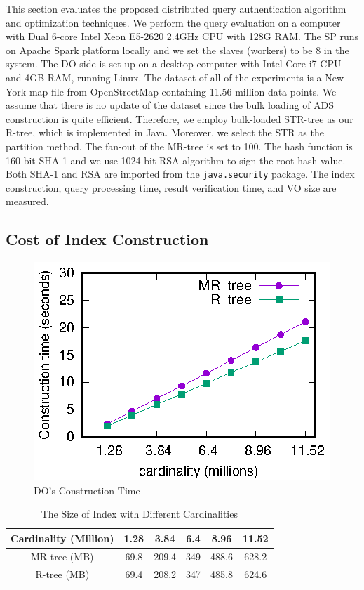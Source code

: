 This section evaluates the proposed distributed query authentication algorithm and optimization techniques. We perform the query evaluation on a computer with Dual 6-core Intel Xeon E5-2620 2.4GHz CPU with 128G RAM\@. %
The SP runs on Apache Spark platform locally and we set the slaves (workers) to be $8$ in the system. The DO side is set up on a desktop computer with Intel Core i7 CPU and 4GB RAM, running Linux. The dataset of all of the experiments is a New York map file from OpenStreetMap containing 11.56 million data points. We assume that there is no update of the dataset since the bulk loading of ADS construction is quite efficient. Therefore, we employ bulk-loaded STR-tree as our R-tree, which is implemented in Java. Moreover, we select the STR as the partition method. The fan-out of the MR-tree is set to 100. The hash function is 160-bit SHA-1 and we use 1024-bit RSA algorithm to sign the root hash value. Both SHA-1 and RSA are imported from the \texttt{java.security} package. The index construction, query processing time, result verification time, and VO size are measured.

\subsection{Cost of Index Construction}

\begin{figure}[t]
  \centering
  \includegraphics[width=0.35\linewidth]{exp-figs/knn/indexconstructtime.eps}
  \caption{DO's Construction Time}\label{fig:knn:do-time}
\end{figure}

\begin{table}[t]
  \centering
  \begin{tabular}{cccccc}
    \toprule
    Cardinality (Million) & 1.28 & 3.84  & 6.4  & 8.96  & 11.52\\
    \midrule
    MR-tree (MB)              & 69.8 & 209.4 & 349 & 488.6 & 628.2\\
    R-tree (MB)               & 69.4 & 208.2 & 347 & 485.8  & 624.6\\
    \bottomrule
  \end{tabular}
  \caption{The Size of Index with Different Cardinalities}\label{tab:knn:index-size}
\end{table}

